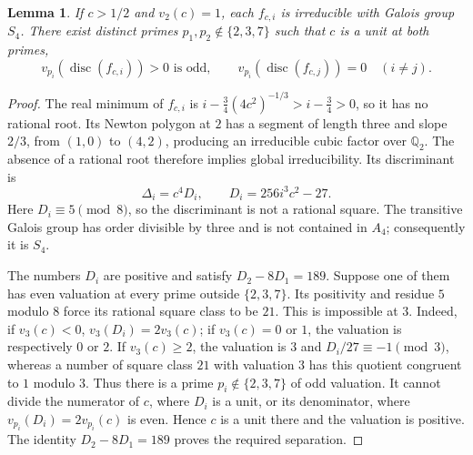 \documentclass[11pt]{article}
\newtheorem{lemma}[theorem]{Lemma}
\newcommand{\Q}{\mathbb Q}
\begin{document}
\begin{lemma}\label{galois}
If $c>1/2$ and $v_2(c)=1$, each $f_{c,i}$ is irreducible with Galois
group $S_4$. There exist distinct primes $p_1,p_2\notin\{2,3,7\}$ such that $c$ is
a unit at both primes,
\[
 v_{p_i}(\operatorname{disc}(f_{c,i}))>0\text{ is odd},\qquad
 v_{p_i}(\operatorname{disc}(f_{c,j}))=0\quad(i\ne j).
\]
\end{lemma}
\begin{proof}
The real minimum of $f_{c,i}$ is
$i-\frac34(4c^2)^{-1/3}>i-\frac34>0$, so it has no rational root.
Its Newton polygon at $2$ has a segment of length three and slope
$2/3$, from $(1,0)$ to $(4,2)$, producing an irreducible cubic factor
over $\Q_2$. The absence of a rational root therefore implies global
irreducibility. Its discriminant is
\[
 \Delta_i=c^4D_i,\qquad D_i=256i^3c^2-27.
\]
Here $D_i\equiv5\pmod8$, so the discriminant is not a rational square.
The transitive Galois group has order divisible by three and is not
contained in $A_4$; consequently it is $S_4$.

The numbers $D_i$ are positive and satisfy
$D_2-8D_1=189$. Suppose one of them has even valuation at every prime
outside $\{2,3,7\}$. Its positivity and residue $5$ modulo $8$ force
its rational square class to be $21$. This is impossible at $3$.
Indeed, if $v_3(c)<0$, $v_3(D_i)=2v_3(c)$; if $v_3(c)=0$ or $1$, the
valuation is respectively $0$ or $2$. If $v_3(c)\ge2$, the valuation
is $3$ and $D_i/27\equiv-1\pmod3$, whereas a number of square class
$21$ with valuation $3$ has this quotient congruent to $1$ modulo $3$.
Thus there is a prime $p_i\notin\{2,3,7\}$ of odd valuation. It cannot divide the
numerator of $c$, where $D_i$ is a unit, or its denominator, where
$v_{p_i}(D_i)=2v_{p_i}(c)$ is even. Hence $c$ is a unit there and the
valuation is positive. The identity $D_2-8D_1=189$ proves the required
separation.
\end{proof}
\end{document}
